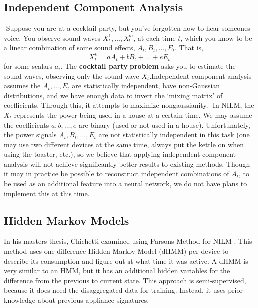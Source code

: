 \documentclass{article}
\begin{document}
\subsection{Independent Component Analysis}
​
Suppose you are at a cocktail party, but you've forgotten how to hear someones voice.
You observe sound waves $X^1_t, \dots, X^m_t$, at each time $t$, which you know to be a linear combination of some sound effects, $A_t, B_t, \dots, E_t$.
That is,
%
\[ X_t^k = a A_t + b B_t + \dots + e E_t \]
%
for some scalars $a_i$.
The {\bf cocktail party problem} asks you to estimate the sound waves, observing only the sound wave $X_t$.
​
Independent component analysis assumes the $A_t, \dots, E_t$ are statistically independent, have non-Gaussian distributions, and we have enough data to invert the `mixing matrix' of coefficients.
Through this, it attempts to maximize nongaussianity. %
​
In NILM, the $X_t$ represents the power being used in a house at a certain time.
We may assume the coefficients $a, b, \dots, e$ are binary (used or not used in a house).
Unfortunately, the power signals $A_t, B_t, \dots, E_t$ are not statistically independent in this task (one may use two different devices at the same time, always put the kettle on when using the toaster, etc.), so we believe that applying independent component analysis will not achieve significantly better results to existing methods.
Though it may in practice be possible to reconstruct independent combinations of $A_t$, to be used as an additional feature into a neural network, we do not have plans to implement this at this time. \cite{Aapo}

\subsection{Hidden Markov Models}

In his masters thesis, Chichetti \cite{Cicchetti} examined using Parsons Method for NILM \cite{Cicchetti}.
This method uses one difference Hidden Markov Model (dHMM) per device to describe its consumption and figure out at what time it was active.
A dHMM is very similar to an HMM, but it has an additional hidden variables for the difference from the previous to current state.
This approach is semi-supervised, because it does need the disaggregated data for training.
Instead, it uses prior knowledge about previous appliance signatures.

\end{document}

